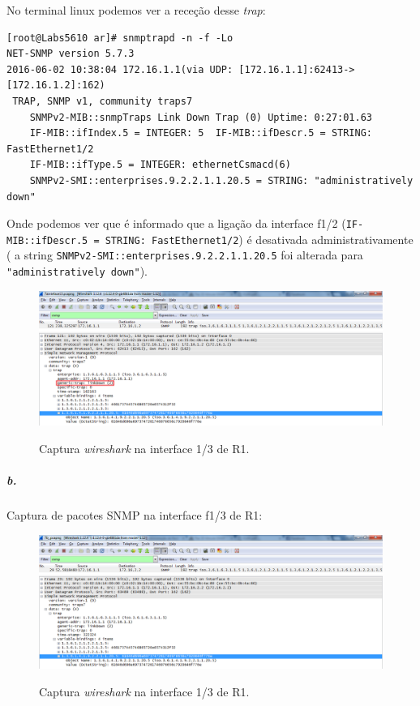 No terminal \textsf{linux} podemos ver a receção desse \emph{trap}:
\begin{verbatim}
[root@Labs5610 ar]# snmptrapd -n -f -Lo
NET-SNMP version 5.7.3
2016-06-02 10:38:04 172.16.1.1(via UDP: [172.16.1.1]:62413->[172.16.1.2]:162)
 TRAP, SNMP v1, community traps7
	SNMPv2-MIB::snmpTraps Link Down Trap (0) Uptime: 0:27:01.63
	IF-MIB::ifIndex.5 = INTEGER: 5	IF-MIB::ifDescr.5 = STRING: FastEthernet1/2
	IF-MIB::ifType.5 = INTEGER: ethernetCsmacd(6)	
	SNMPv2-SMI::enterprises.9.2.2.1.1.20.5 = STRING: "administratively down"
\end{verbatim}

Onde podemos ver que é informado que a ligação da interface \textsf{f1/2} (\texttt{IF-MIB::ifDescr.5 = STRING: FastEthernet1/2}) é desativada administrativamente ( a string \texttt{SNMPv2-SMI::enterprises.9.2.2.1.1.20.5} foi alterada para \texttt{"administratively down"}).

\begin{figure}[h]
\centering
\includegraphics[width=1\textwidth, height=0.3\textheight]{7a.png}
\label{fig:10-capturaWireshark}
\caption{Captura \emph{wireshark} na interface \textsf{1/3} de \textsf{R1}.}
\end{figure}

\newpage

\subparagraph{b.}
Captura de pacotes SNMP na interface \textsf{f1/3} de \textsf{R1}:

\begin{figure}[h]
\centering
\includegraphics[width=1\textwidth, height=0.3\textheight]{7b.png}
\label{fig:11-capturaWireshark}
\caption{Captura \emph{wireshark} na interface \textsf{1/3} de \textsf{R1}.}
\end{figure}

